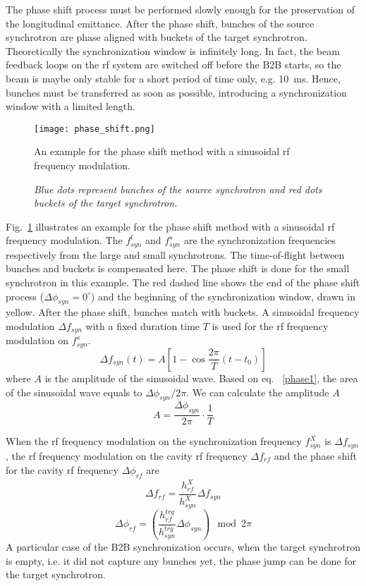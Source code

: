 The phase shift process must be performed slowly enough for the preservation of the longitudinal emittance. After the phase shift, bunches of the source synchrotron are phase aligned with buckets of the target synchrotron. Theoretically the synchronization window is infinitely long. In fact, the beam feedback loops on the rf system are switched off before the B2B starts, so the beam is maybe only stable for a short period of time only, e.g. \SI{10}{ms}. Hence, bunches must be transferred as soon as possible, introducing a synchronization window with a limited length.
\begin{figure}[!htb]
   \centering   
   \texttt{[image: phase\_shift.png]}
   \caption{An example for the phase shift method with a sinusoidal rf frequency modulation.}
	\caption*{\textsl{\small{Blue dots represent bunches of the source synchrotron and red dots buckets of the target synchrotron.}}}
   \label{phase_shift}
\end{figure}


Fig.~\ref{phase_shift} illustrates an example for the phase shift method with a sinusoidal rf frequency modulation. The $f_{\mathit{syn}}^{l}$ and $f_{\mathit{syn}}^{s}$ are the synchronization frequencies respectively from the large and small synchrotrons. The time-of-flight between bunches and buckets is compensated here. The phase shift is done for the small synchrotron in this example. The red dashed line shows the end of the phase shift process ($\Delta \phi_\mathit{syn}=0^\circ$) and the beginning of the synchronization window, drawn in yellow. After the phase shift, bunches match with buckets. A sinusoidal frequency modulation $\Delta f_{\mathit{syn}}$ with a fixed duration time $T$ is used for the rf frequency modulation on $f_{\mathit{syn}}^{s}$.
\begin{equation}
\Delta f_{\mathit{syn}}(t)=A[1-\cos \frac{2\pi}{T}(t-t_0)]
\end{equation}
where $A$ is the amplitude of the sinusoidal wave. Based on eq. ~\ref{phase1}, the area of the sinusoidal wave equals to $\Delta \phi_\mathit{syn}/2\pi$. We can calculate the amplitude $A$  
\begin{equation}
A= \frac{\Delta \phi_\mathit{syn}}{2\pi}\cdot\frac{1}{T}
\end{equation}

When the rf frequency modulation on the synchronization frequency $f_{\mathit{syn}}^{X}$ is $\Delta f_{\mathit{syn}}$, the rf frequency modulation on the cavity rf frequency $\Delta f_{\mathit{rf}}$ and the phase shift for the cavity rf frequency $\Delta \phi_\mathit{rf}$ are
\begin{equation}
\Delta f_{\mathit{rf}}=\frac{h_\mathit{rf}^\mathit{X}}{h_\mathit{syn}^\mathit{X}}\Delta f_{\mathit{syn}}
\end{equation}
\begin{equation}
\Delta \phi_\mathit{rf}=(\frac{h_\mathit{rf}^\mathit{trg}}{h_\mathit{syn}^\mathit{trg}}\Delta\phi_\mathit{syn}) \mod 2\pi
\end{equation} 
A particular case of the B2B synchronization occurs, when the target synchrotron is empty, i.e. it did not capture any bunches yet, the phase jump can be done for the target synchrotron.

